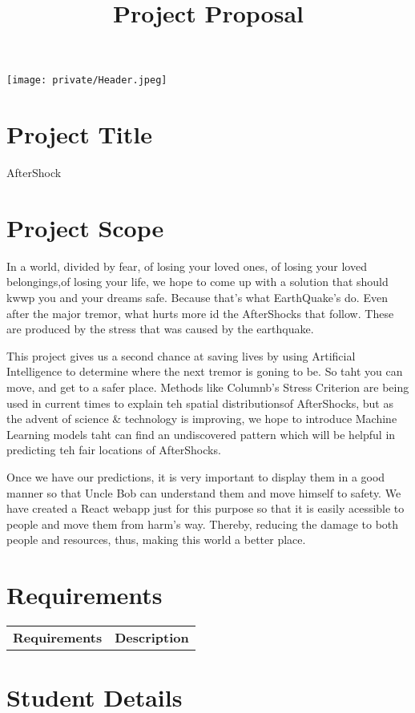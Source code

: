 \documentclass{article}
\title{Project Proposal}
\author{}
\date{}
\begin{document}
\texttt{[image: private/Header.jpeg]}
\vspace{3em}

\section{Project Title}

\Large{AfterShock}

\section{Project Scope}

In a world, divided by fear, of losing your loved ones, of losing your loved belongings,of losing your life, we hope to come up with a solution that should kwwp you and your dreams safe. Because that's what EarthQuake's do. Even after the major tremor, what hurts more id the AfterShocks that follow. These are produced by the stress that was caused by the earthquake.

This project gives us a second chance at saving lives by using Artificial Intelligence to determine where the next tremor is goning to be. So taht you can move, and get to a safer place. Methods like Columnb's Stress Criterion are being used in current times to explain teh spatial distributionsof AfterShocks, but as the advent of science \& technology is improving, we hope to introduce Machine Learning models taht can find an undiscovered pattern which will be helpful in predicting teh fair locations of AfterShocks.

Once we have our predictions, it is very important to display them in a good manner so that Uncle Bob can understand them and move himself to safety. We have created a React webapp just for this purpose so that it is easily acessible to people and move them from harm's way. Thereby, reducing the damage to both people and resources, thus, making this world a better place.

\section{Requirements}

\begin{tabular}{ll}
\textbf{Requirements} & \textbf{Description} \\
\end{tabular}

\section*{Student Details}
\end{document}
